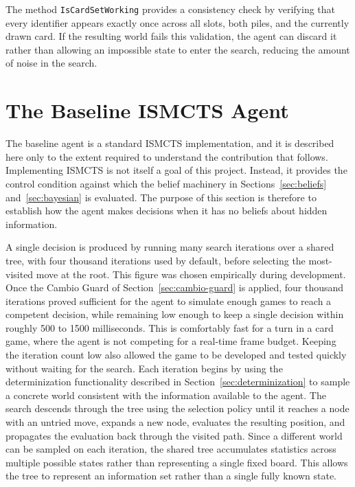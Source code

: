 \documentclass[12pt,a4paper,oneside]{report}
\begin{document}
The method \texttt{IsCardSetWorking} provides a consistency check by verifying that every identifier appears exactly once across all slots, both piles, and the currently drawn card. If the resulting world fails this validation, the agent can discard it rather than allowing an impossible state to enter the search, reducing the amount of noise in the search.

\section{The Baseline ISMCTS Agent}
\label{sec:ismcts}

The baseline agent is a standard ISMCTS implementation, and it is described here only to the extent required to understand the contribution that follows. Implementing ISMCTS is not itself a goal of this project. Instead, it provides the control condition against which the belief machinery in Sections~\ref{sec:beliefs} and~\ref{sec:bayesian} is evaluated. The purpose of this section is therefore to establish how the agent makes decisions when it has no beliefs about hidden information. 

A single decision is produced by running many search iterations over a shared tree, with four thousand iterations used by default, before selecting the most-visited move at the root. This figure was chosen empirically during development. Once the Cambio Guard of Section~\ref{sec:cambio-guard} is applied, four thousand iterations proved sufficient for the agent to simulate enough games to reach a competent decision, while remaining low enough to keep a single decision within roughly 500 to 1500 milliseconds. This is comfortably fast for a turn in a card game, where the agent is not competing for a real-time frame budget. Keeping the iteration count low also allowed the game to be developed and tested quickly without waiting for the search.
 Each iteration begins by using the determinization functionality described in Section~\ref{sec:determinization} to sample a concrete world consistent with the information available to the agent. The search descends through the tree using the selection policy until it reaches a node with an untried move, expands a new node, evaluates the resulting position, and propagates the evaluation back through the visited path. Since a different world can be sampled on each iteration, the shared tree accumulates statistics across multiple possible states rather than representing a single fixed board. This allows the tree to represent an information set rather than a single fully known state. 
\end{document}
